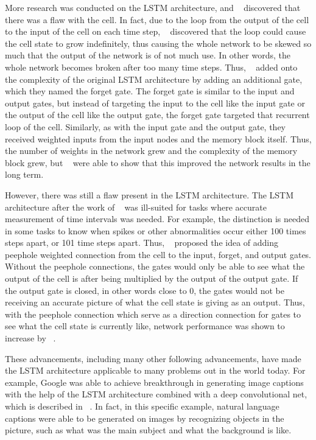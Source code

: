 \documentclass[11pt,letterpaper]{article}
\begin{document}
More research was conducted on the LSTM architecture, and ~\cite{Gers:99} discovered that there was a flaw with the cell. In fact, due to the loop from the output of the cell to the input of the cell on each time step, ~\cite{Gers:99} discovered that the loop could cause the cell state to grow indefinitely, thus causing the whole network to be skewed so much that the output of the network is of not much use. In other words, the whole network becomes broken after too many time steps. Thus, ~\cite{Gers:99} added onto the complexity of the original LSTM architecture by adding an additional gate, which they named the forget gate. The forget gate is similar to the input and output gates, but instead of targeting the input to the cell like the input gate or the output of the cell like the output gate, the forget gate targeted that recurrent loop of the cell. Similarly, as with the input gate and the output gate, they received weighted inputs from the input nodes and the memory block itself. Thus, the number of weights in the network grew and the complexity of the memory block grew, but ~\cite{Gers:99} were able to show that this improved the network results in the long term.

However, there was still a flaw present in the LSTM architecture. The LSTM architecture after the work of ~\cite{Gers:99} was ill-suited for tasks where accurate measurement of time intervals was needed. For example, the distinction is needed in some tasks to know when spikes or other abnormalities occur either 100 times steps apart, or 101 time steps apart. Thus, ~\cite{Gers:02} proposed the idea of adding peephole weighted connection from the cell to the input, forget, and output gates. Without the peephole connections, the gates would only be able to see what the output of the cell is after being multiplied by the output of the output gate. If the output gate is closed, in other words close to 0, the gates would not be receiving an accurate picture of what the cell state is giving as an output. Thus, with the peephole connection which serve as a direction connection for gates to see what the cell state is currently like, network performance was shown to increase by ~\cite{Gers:02}.

These advancements, including many other following advancements, have made the LSTM architecture applicable to many problems out in the world today. For example, Google was able to achieve breakthrough in generating image captions with the help of the LSTM architecture combined with a deep convolutional net, which is described in ~\cite{Vinyals:14}. In fact, in this specific example, natural language captions were able to be generated on images by recognizing objects in the picture, such as what was the main subject and what the background is like. 
\end{document}
